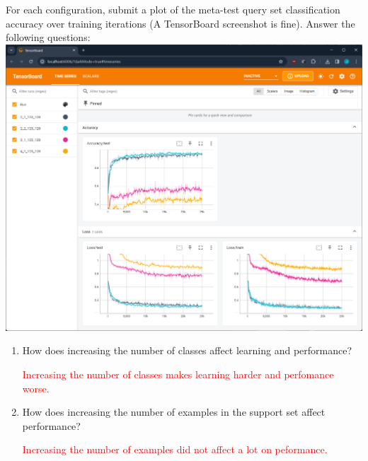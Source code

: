 \documentclass[12pt]{article}
\begin{document}
For each configuration, submit a plot of the meta-test query set classification accuracy over training iterations (A TensorBoard screenshot is fine). Answer the following questions:
\\
\includegraphics[width=\linewidth]{figures/problem3.png}
\begin{enumerate}
    \item How does increasing the number of classes affect learning and performance?
    
    \textcolor{red}{Increasing the number of classes makes learning harder and perfomance worse.}
    
    \item How does increasing the number of examples in the support set affect performance?
    
   \textcolor{red}{Increasing the number of examples did not affect a lot on peformance.}
    
\end{enumerate}
\end{document}

